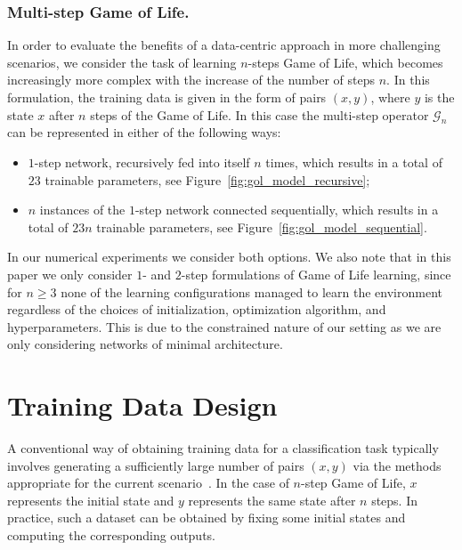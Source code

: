 \documentclass[letterpaper]{article} %
\begin{document}
\subsubsection{Multi-step Game of Life.}
In order to evaluate the benefits of a data-centric approach in more challenging scenarios, we consider the task of learning $n$-steps Game of Life, which becomes increasingly more complex with the increase of the number of steps $n$.
In this formulation, the training data is given in the form of pairs $(x,y)$, where $y$ is the state $x$ after $n$ steps of the Game of Life. %
In this case the multi-step operator $\mathcal{G}_n$ can be represented in either of the following ways:
\begin{itemize}
    \item $1$-step network, recursively fed into itself $n$ times, which results in a total of $23$ trainable parameters, see Figure~\ref{fig:gol_model_recursive};
    \item $n$ instances of the $1$-step network connected sequentially, which results in a total of $23n$ trainable parameters, see Figure~\ref{fig:gol_model_sequential}.
\end{itemize}
In our numerical experiments we consider both options.
We also note that in this paper we only consider $1$- and $2$-step formulations of Game of Life learning, since for $n \ge 3$ none of the learning configurations managed to learn the environment regardless of the choices of initialization, optimization algorithm, and hyperparameters.
This is due to the constrained nature of our setting as we are only considering networks of minimal architecture.


\section{Training Data Design}
A conventional way of obtaining training data for a classification task typically involves generating a sufficiently large number of pairs $(x,y)$ via the methods appropriate for the current scenario~\cite{roh2019survey}.
In the case of $n$-step Game of Life, $x$ represents the initial state and $y$ represents the same state after $n$ steps.
In practice, such a dataset can be obtained by fixing some initial states and computing the corresponding outputs.
\end{document}
